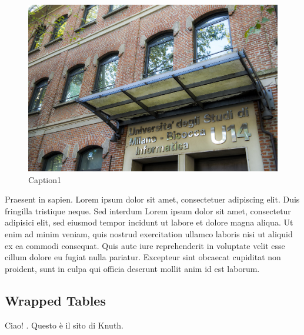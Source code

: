 \documentclass[a4paper, oneside]{book}
\begin{document}
\begin{figure}
\includegraphics[width=0.9\linewidth]{u14} 
\caption{Caption1}
\label{fig:wrapfig}
\end{figure}

Praesent in sapien. Lorem ipsum dolor sit amet, consectetuer 
adipiscing elit. Duis fringilla tristique neque. Sed interdum
Lorem ipsum dolor sit amet, consectetur adipisici elit, sed eiusmod tempor incidunt ut labore et dolore magna aliqua. Ut enim ad minim veniam, quis nostrud exercitation ullamco laboris nisi ut aliquid ex ea commodi consequat. Quis aute iure reprehenderit in voluptate velit esse cillum dolore eu fugiat nulla pariatur. Excepteur sint obcaecat cupiditat non proident, sunt in culpa qui officia deserunt mollit anim id est laborum.

\subsection{Wrapped Tables}

Ciao! \cite{knuthwebsite}. Questo è il sito di Knuth.
\end{document}
